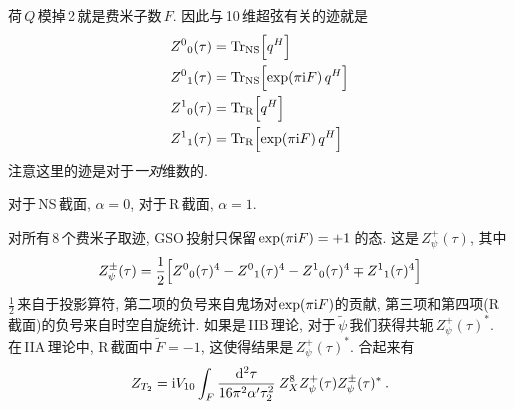 荷$\,Q\,$模掉\,2\,就是费米子数$\,F$. 因此与\,10\,维超弦有关的迹就是
\begin{subequations}
    \begin{align}
        Z^{0}{}_{0}(\tau) &= \operatorname{Tr}_{\text{NS}} \Bigl[ q^{H}\Bigr] \label{10.7.8a} \\
        Z^{0}{}_{1}(\tau) &= \operatorname{Tr}_{\text{NS}} \Bigl[ \exp(\pi\mathrm{i} F)\, q^{H}\Bigr] \label{10.7.8b} \\
        Z^{1}{}_{0}(\tau) &= \operatorname{Tr}_{\text{R}} \Bigl[ q^{H}\Bigr] \label{10.7.8c} \\
        Z^{1}{}_{1}(\tau) &= \operatorname{Tr}_{\text{R}} \Bigl[ \exp(\pi\mathrm{i} F)\, q^{H}\Bigr] \label{10.7.8d}
    \end{align} \label{10.7.8}
\end{subequations}
注意这里的迹是对于{\emph{一对}}维数的.
\begin{tcolorbox}
\noindent 对于\,NS\,截面, $\alpha=0$, 对于\,R\,截面, $\alpha=1$.
\end{tcolorbox}

对所有\,8\,个费米子取迹, GSO\,投射只保留$\,\exp(\pi\mathrm{i} F)=+1\,$的态. 这是$\,Z_{\psi}^{+}(\tau)$, 其中
\begin{equation}
    Z_{\psi}^{\pm}(\tau) = \frac{1}{2} \Bigl[Z^{0}{}_{0}(\tau)^{4}-Z^{0}{}_{1}(\tau)^{4}-Z^{1}{}_{0}(\tau)^{4}\mp Z^{1}{}_{1}(\tau)^{4} \Bigr] \label{10.7.9}
\end{equation}
$\frac{1}{2}\,$来自于投影算符, 第二项的负号来自鬼场对$\exp(\pi\mathrm{i} F)$的贡献, 第三项和第四项(R\,截面)的负号来自时空自旋统计. 如果是\,IIB\,理论, 对于$\,\tilde{\psi}\,$我们获得共轭$\,Z_{\psi}^{+}(\tau)^{\ast}$. 在\,IIA\,理论中, R\,截面中$\,\tilde{F}=-1$, 这使得结果是$\,Z_{\psi}^{+}(\tau)^{\ast}$. 合起来有
\begin{equation}
    Z_{T_{2}} = \mathrm{i} V_{10} \int_{F}\frac{\mathrm{d}^{2}\tau}{16\pi^{2}\alpha^{\prime}\tau_{2}^{2}}\:Z_{X}^{8}Z_{\psi}^{+}(\tau)Z_{\psi}^{\pm}(\tau)^{\ast} \:. \label{10.7.10}
\end{equation}

